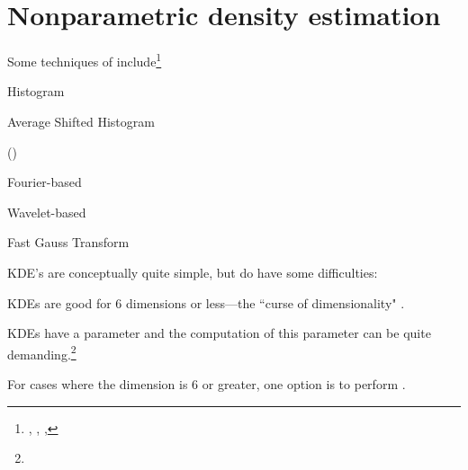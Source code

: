 
\section{Nonparametric density estimation}
Some techniques of  include\footnote{
  ,
  ,
  ,
  }
\begin{listi}
  \item Histogram %
  \item Average Shifted Histogram
  \item {} ()
  \item Fourier-based
  \item Wavelet-based
  \item Fast Gauss Transform
\end{listi}

KDE's are conceptually quite simple, but do have some difficulties:
\begin{listi}
  \item KDEs are good for 6 dimensions or less---the ``curse of dimensionality" .
  \item KDEs have a  parameter and the computation of this parameter can be quite demanding.\footnote{
        }
\end{listi}

For cases where the dimension is 6 or greater, one option is to perform 
 .
